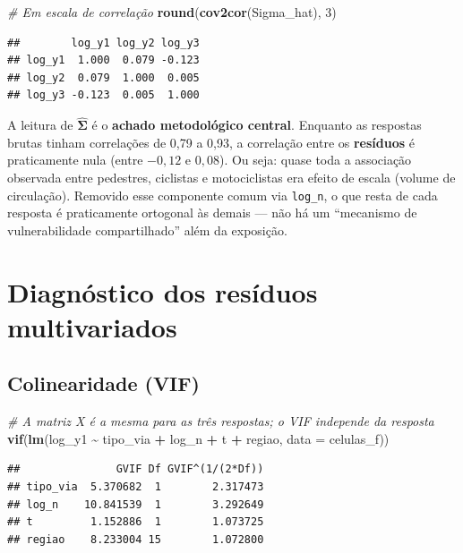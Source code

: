 \documentclass[
  11pt,
]{article}
\newenvironment{Shaded}{\begin{snugshade}}{\end{snugshade}}
\newcommand{\AttributeTok}[1]{\textcolor[rgb]{0.13,0.29,0.53}{#1}}
\newcommand{\CommentTok}[1]{\textcolor[rgb]{0.56,0.35,0.01}{\textit{#1}}}
\newcommand{\DecValTok}[1]{\textcolor[rgb]{0.00,0.00,0.81}{#1}}
\newcommand{\FunctionTok}[1]{\textcolor[rgb]{0.13,0.29,0.53}{\textbf{#1}}}
\newcommand{\NormalTok}[1]{#1}
\newcommand{\SpecialCharTok}[1]{\textcolor[rgb]{0.81,0.36,0.00}{\textbf{#1}}}
\begin{document}
\begin{Shaded}
\begin{Highlighting}[]
\CommentTok{\# Em escala de correlação}
\FunctionTok{round}\NormalTok{(}\FunctionTok{cov2cor}\NormalTok{(Sigma\_hat), }\DecValTok{3}\NormalTok{)}
\end{Highlighting}
\end{Shaded}

\begin{verbatim}
##        log_y1 log_y2 log_y3
## log_y1  1.000  0.079 -0.123
## log_y2  0.079  1.000  0.005
## log_y3 -0.123  0.005  1.000
\end{verbatim}

A leitura de \(\hat{\boldsymbol{\Sigma}}\) é o \textbf{achado
metodológico central}. Enquanto as respostas brutas tinham correlações
de 0,79 a 0,93, a correlação entre os \textbf{resíduos} é praticamente
nula (entre \(-0,12\) e \(0,08\)). Ou seja: quase toda a associação
observada entre pedestres, ciclistas e motociclistas era efeito de
escala (volume de circulação). Removido esse componente comum via
\texttt{log\_n}, o que resta de cada resposta é praticamente ortogonal
às demais --- não há um ``mecanismo de vulnerabilidade compartilhado''
além da exposição.

\newpage

\section{Diagnóstico dos resíduos
multivariados}\label{diagnuxf3stico-dos-resuxedduos-multivariados}

\subsection{Colinearidade (VIF)}\label{colinearidade-vif}

\begin{Shaded}
\begin{Highlighting}[]
\CommentTok{\# A matriz X é a mesma para as três respostas; o VIF independe da resposta}
\FunctionTok{vif}\NormalTok{(}\FunctionTok{lm}\NormalTok{(log\_y1 }\SpecialCharTok{\textasciitilde{}}\NormalTok{ tipo\_via }\SpecialCharTok{+}\NormalTok{ log\_n }\SpecialCharTok{+}\NormalTok{ t }\SpecialCharTok{+}\NormalTok{ regiao, }\AttributeTok{data =}\NormalTok{ celulas\_f))}
\end{Highlighting}
\end{Shaded}

\begin{verbatim}
##               GVIF Df GVIF^(1/(2*Df))
## tipo_via  5.370682  1        2.317473
## log_n    10.841539  1        3.292649
## t         1.152886  1        1.073725
## regiao    8.233004 15        1.072800
\end{verbatim}
\end{document}
